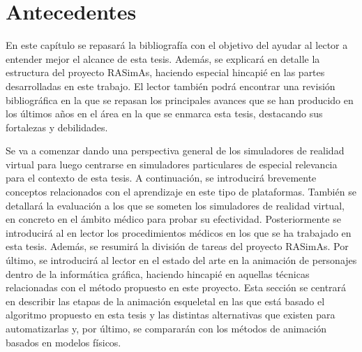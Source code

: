 \chapter*{Antecedentes} 
\label{cap:related}



En este capítulo se repasará la bibliografía con el objetivo del ayudar al lector a entender mejor el alcance de esta tesis.
Además, se explicará en detalle la estructura del proyecto \ac{RASimAs}, haciendo especial hincapié en las partes desarrolladas en este trabajo. El lector también podrá encontrar una revisión bibliográfica en la que se repasan los principales avances que se han producido en los últimos años en el área en la que se enmarca esta tesis, destacando sus fortalezas y debilidades. 

Se va a comenzar dando una perspectiva general de los simuladores de realidad virtual para luego centrarse en simuladores particulares de especial relevancia para el contexto de esta tesis. A continuación, se introducirá brevemente conceptos relacionados con el aprendizaje en este tipo de plataformas. También se detallará la evaluación a los que se someten los simuladores de realidad virtual, en concreto en el ámbito médico para probar su efectividad. Posteriormente se introducirá al en lector los procedimientos médicos en los que se ha trabajado en esta tesis. Además, se resumirá la división de tareas del proyecto \ac{RASimAs}. 
Por último, se introducirá al lector en el estado del arte  en la animación de personajes dentro de la informática gráfica, haciendo hincapié en aquellas técnicas relacionadas con el método propuesto en este proyecto. Esta sección se centrará en describir las etapas de la animación esqueletal en las que está basado el algoritmo propuesto en esta tesis y las distintas alternativas que existen para automatizarlas y, por último, se compararán con los métodos de animación basados en modelos físicos.


